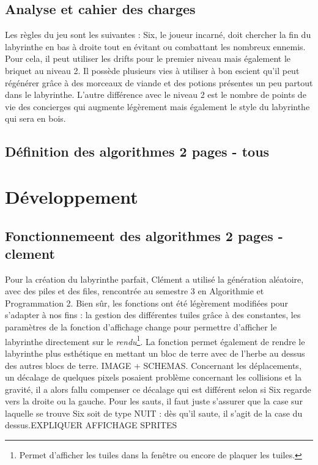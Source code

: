 \documentclass[10pt]{article}
\begin{document}
   \subsection{Analyse et cahier des charges}
   Les règles du jeu sont les suivantes : Six, le joueur incarné, doit chercher la fin du labyrinthe en bas à droite tout en évitant ou combattant les 
   nombreux ennemis. Pour cela, il peut utiliser les drifts pour le premier niveau mais également le briquet au niveau 2. Il possède plusieurs vies à 
   utiliser à bon escient qu'il peut régénérer grâce à des morceaux de viande et des potions présentes un peu partout dans le labyrinthe. L'autre
   différence avec le niveau 2 est le nombre de points de vie des concierges qui augmente légèrement mais également le style du labyrinthe qui sera en bois.

   \subsection{Définition des algorithmes 2 pages - tous}

\section{Développement}
   \subsection{Fonctionnemeent des algorithmes 2 pages - clement}
   Pour la création du labyrinthe parfait, Clément a utilisé la génération aléatoire, avec des piles et des files, rencontrée au semestre 3 en Algorithmie et Programmation 2.
   Bien sûr, les fonctions ont été légèrement modifiées pour s'adapter à nos fins : la gestion des différentes tuiles grâce à des constantes, les 
   paramètres de la fonction d'affichage change pour permettre d'afficher le labyrinthe directement sur le \textit{rendu}\footnote{
   Permet d'afficher les tuiles dans la fenêtre ou encore de plaquer les tuiles.}. La fonction permet également de rendre le labyrinthe plus esthétique
   en mettant un bloc de terre avec de l'herbe au dessus des autres blocs de terre. IMAGE + SCHEMAS. Concernant les déplacements, un décalage de quelques
   pixels posaient problème concernant les collisions et la gravité, il a alors fallu compenser ce décalage qui est différent selon si Six regarde vers
   la droite ou la gauche. Pour les sauts, il faut juste s'assurer que la case sur laquelle se trouve Six soit de type NUIT : dès qu'il saute, il s'agit
   de la case du dessus.EXPLIQUER AFFICHAGE SPRITES
\end{document}
